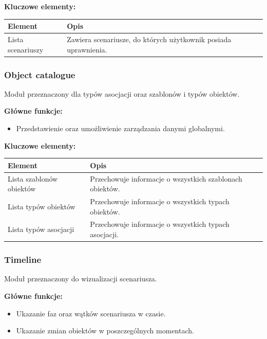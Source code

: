 \textbf{Kluczowe elementy:}
\begin{table}[H]
    \centering
    \begin{tabular}{|l|p{10cm}|}
        \hline
        \textbf{Element} & \textbf{Opis} \\
        \hline
        Lista scenariuszy & Zawiera scenariusze, do których użytkownik posiada uprawnienia. \\
        \hline
    \end{tabular}
\end{table}

\vspace{1em}

\subsubsection*{Object catalogue}
Moduł przeznaczony dla typów asocjacji oraz szablonów i typów obiektów.

\textbf{Główne funkcje:}
\begin{itemize}
    \item Przedstawienie oraz umożliwienie zarządzania danymi globalnymi.
\end{itemize}

\textbf{Kluczowe elementy:}
\begin{table}[H]
    \centering
    \begin{tabular}{|l|p{10cm}|}
        \hline
        \textbf{Element} & \textbf{Opis} \\
        \hline
        Lista szablonów obiektów & Przechowuje informacje o wszystkich szablonach obiektów. \\
        \hline
        Lista typów obiektów & Przechowuje informacje o wszystkich typach obiektów. \\
        \hline
        Lista typów asocjacji & Przechowuje informacje o wszystkich typach asocjacji. \\
        \hline
    \end{tabular}
\end{table}

\vspace{1em}

\subsubsection*{Timeline}
Moduł przeznaczony do wizualizacji scenariusza.

\textbf{Główne funkcje:}
\begin{itemize}
    \item Ukazanie faz oraz wątków scenariusza w czasie.
    \item Ukazanie zmian obiektów w poszczególnych momentach.
\end{itemize}

